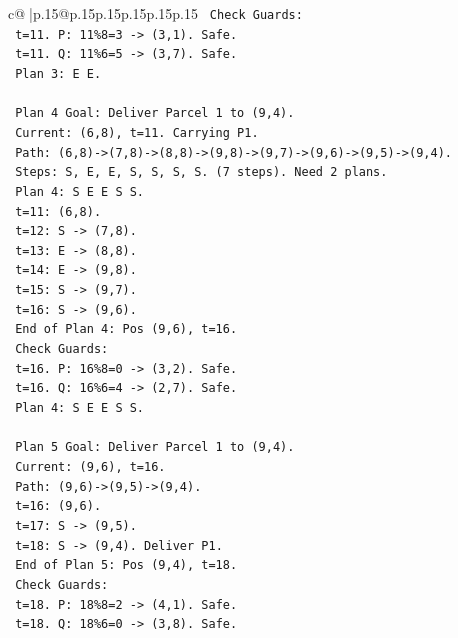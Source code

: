 \documentclass{article}
\begin{document}
{\begin{supertabular}{c@{$\;$}|p{.15\linewidth}@{}p{.15\linewidth}p{.15\linewidth}p{.15\linewidth}p{.15\linewidth}p{.15\linewidth}}
{{{\texttt{    Check Guards:} \\
\texttt{    t=11. P: 11\%8=3 {-}> (3,1). Safe.} \\
\texttt{    t=11. Q: 11\%6=5 {-}> (3,7). Safe.} \\
\texttt{    Plan 3: E E.} \\
\\ 
\texttt{    Plan 4 Goal: Deliver Parcel 1 to (9,4).} \\
\texttt{    Current: (6,8), t=11. Carrying P1.} \\
\texttt{    Path: (6,8){-}>(7,8){-}>(8,8){-}>(9,8){-}>(9,7){-}>(9,6){-}>(9,5){-}>(9,4).} \\
\texttt{    Steps: S, E, E, S, S, S, S. (7 steps). Need 2 plans.} \\
\texttt{    Plan 4: S E E S S.} \\
\texttt{    t=11: (6,8).} \\
\texttt{    t=12: S {-}> (7,8).} \\
\texttt{    t=13: E {-}> (8,8).} \\
\texttt{    t=14: E {-}> (9,8).} \\
\texttt{    t=15: S {-}> (9,7).} \\
\texttt{    t=16: S {-}> (9,6).} \\
\texttt{    End of Plan 4: Pos (9,6), t=16.} \\
\texttt{    Check Guards:} \\
\texttt{    t=16. P: 16\%8=0 {-}> (3,2). Safe.} \\
\texttt{    t=16. Q: 16\%6=4 {-}> (2,7). Safe.} \\
\texttt{    Plan 4: S E E S S.} \\
\\ 
\texttt{    Plan 5 Goal: Deliver Parcel 1 to (9,4).} \\
\texttt{    Current: (9,6), t=16.} \\
\texttt{    Path: (9,6){-}>(9,5){-}>(9,4).} \\
\texttt{    t=16: (9,6).} \\
\texttt{    t=17: S {-}> (9,5).} \\
\texttt{    t=18: S {-}> (9,4). Deliver P1.} \\
\texttt{    End of Plan 5: Pos (9,4), t=18.} \\
\texttt{    Check Guards:} \\
\texttt{    t=18. P: 18\%8=2 {-}> (4,1). Safe.} \\
\texttt{    t=18. Q: 18\%6=0 {-}> (3,8). Safe.} \\
}}}
\end{supertabular}}
\end{document}
